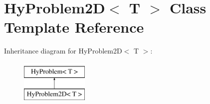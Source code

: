 \hypertarget{classHyProblem2D}{
\section{HyProblem2D$<$ T $>$ Class Template Reference}
\label{classHyProblem2D}
}
Inheritance diagram for HyProblem2D$<$ T $>$:\begin{figure}[H]
\begin{center}
\leavevmode
\includegraphics[height=2cm]{classHyProblem2D}
\end{center}
\end{figure}
